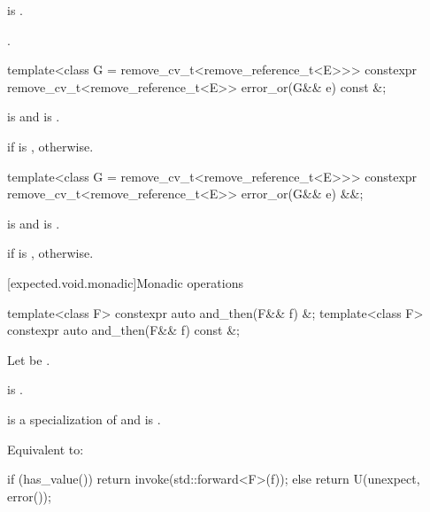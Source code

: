 \begin{itemdescr}
\pnum
\hardexpects
{} is .

\pnum
\returns
{}.
\end{itemdescr}

%
\begin{itemdecl}
template<class G = remove_cv_t<remove_reference_t<E>>>
  constexpr remove_cv_t<remove_reference_t<E>> error_or(G&& e) const &;
\end{itemdecl}

\begin{itemdescr}
\pnum
\mandates
{} is
 and
 is
.

\pnum
\returns
{} if  is ,
 otherwise.
\end{itemdescr}

%
\begin{itemdecl}
template<class G = remove_cv_t<remove_reference_t<E>>>
  constexpr remove_cv_t<remove_reference_t<E>> error_or(G&& e) &&;
\end{itemdecl}

\begin{itemdescr}
\pnum
\mandates
{} is
 and
 is
.

\pnum
\returns
{} if  is ,
 otherwise.
\end{itemdescr}

[expected.void.monadic]{Monadic operations}

%
\begin{itemdecl}
template<class F> constexpr auto and_then(F&& f) &;
template<class F> constexpr auto and_then(F&& f) const &;
\end{itemdecl}

\begin{itemdescr}
\pnum
Let  be .

\pnum
\constraints
{} is .

\pnum
\mandates
{} is a specialization of  and
 is .

\pnum
\effects
Equivalent to:
\begin{codeblock}
if (has_value())
  return invoke(std::forward<F>(f));
else
  return U(unexpect, error());
\end{codeblock}
\end{itemdescr}

